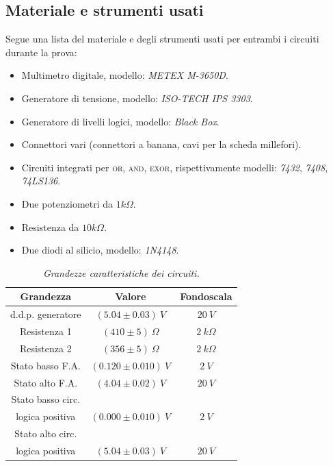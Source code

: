 \subsection{Materiale e strumenti usati}\label{subsec:materiali}
Segue una lista del materiale e degli strumenti usati per entrambi i circuiti durante la prova:
\begin{itemize}
  \item%
  Multimetro digitale, modello: \emph{METEX M-3650D}.
  \item%
  Generatore di tensione, modello: \emph{ISO-TECH IPS 3303}.
  \item%
  Generatore di livelli logici, modello: \emph{Black Box}.
  \item%
  Connettori vari (connettori a banana, cavi per la scheda millefori).
  \item%
  Circuiti integrati per \textsc{or}, \textsc{and}, \textsc{exor}, rispettivamente modelli: \emph{7432}, \emph{7408}, \emph{74LS136}.
  \item%
  Due potenziometri da $1k\Omega$.
  \item%
  Resistenza da $10k\Omega$.
  \item%
  Due diodi al silicio, modello: \emph{1N4148}.
\end{itemize}

\begin{table}[H]
  \centering
  \begin{tabular}[t]{c | c  c }
    \hline
    Grandezza & Valore & Fondoscala \\
    \hline
    d.d.p. generatore & $(5.04 \pm 0.03) \: V$ & $20 \: V$ \\
    Resistenza 1 & $(410 \pm 5) \: \Omega$ & $2 \: k\Omega$ \\
    Resistenza 2 & $(356 \pm 5) \: \Omega$ & $2 \: k\Omega$ \\
    Stato basso F.A. & $(0.120 \pm 0.010) \: V$ & $2 \: V$ \\
    Stato alto F.A. & $(4.04 \pm 0.02) \: V$ & $20 \: V$ \\
    Stato basso circ.\\ logica positiva & $(0.000 \pm 0.010) \: V$ & $2 \: V$ \\
    Stato alto circ.\\ logica positiva & $(5.04 \pm 0.03) \: V$ & $20 \: V$ \\
    \hline
  \end{tabular}
  \caption{\emph{Grandezze caratteristiche dei circuiti.}}
  \label{tab:livelli-logici}
\end{table}
